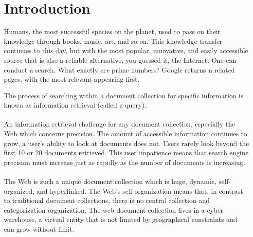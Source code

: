 \section{Introduction}
Humans, the most successful species on the planet, used to pass on their knowledge through books, music, art, and so on. This knowledge transfer continues to this day, but with the most popular, innovative, and easily accessible source that is also a reliable alternative, you guessed it, the Internet. One can conduct a search. What exactly are prime numbers? Google returns n related pages, with the most relevant appearing first.\newline
	
\noindent The process of searching within a document collection for specific information is known as information retrieval (called a query).\\
\\
An information retrieval challenge for any document collection, especially the Web which concerns precision. The amount of accessible information continues to grow, a user's ability to look at documents does not. Users rarely look beyond the first 10 or 20 documents retrieved. This user impatience means that search engine precision must increase just as rapidly as the number of documents is increasing.\\
\\
The Web is such a unique document collection which is huge, dynamic, self-organized, and hyperlinked. The Web's self-organization means that, in contrast to traditional document collections, there is no central collection and categorization organization. The web document collection lives in a cyber warehouse, a virtual entity that is not limited by geographical constraints and can grow without limit.